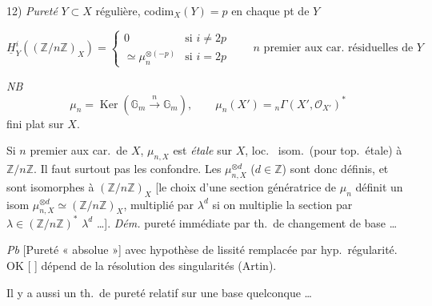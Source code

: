 \documentclass[11pt,a4paper]{article}
\begin{document}
12) \emph{Pureté} $Y \subset X$ régulière, codim${}_X(Y) = p$ en chaque pt
de $Y$


\[
  \underline{H}^i_Y((\mathbb{Z}/n\mathbb{Z})_X) =
  \begin{cases}
    0 & \text{si } i \neq 2p \\
    \simeq \mu_n^{\otimes(-p)} & \text{si } i = 2p
  \end{cases}
  \qquad n \text{ premier aux car.\ résiduelles de } Y
\]

\emph{NB}
\[
  \mu_n = \operatorname{Ker}(\mathbb{G}_m \xrightarrow{\;n\;} \mathbb{G}_m),
  \qquad
  \mu_n(X') = {}_n\Gamma(X', \mathcal{O}_{X'})^{*}
\]
 fini plat sur $X$.

Si $n$ premier aux car.\ de $X$, $\mu_{n,X}$ est \emph{étale} sur $X$, loc.\
isom.\ (pour top.\ étale) à $\mathbb{Z}/n\mathbb{Z}$. Il \add{ne} faut surtout
pas les confondre. Les $\mu_{n,X}^{\otimes d}$ ($d \in \mathbb{Z}$) sont donc
définis, et sont \add{loc.} isomorphes à $(\mathbb{Z}/n\mathbb{Z})_X$ [le
choix d'une section génératrice de $\mu_n$ définit un isom
$\mu_{n,X}^{\otimes d} \simeq (\mathbb{Z}/n\mathbb{Z})_X$, multiplié par
$\lambda^d$ si on multiplie la section par
$\lambda \in (\mathbb{Z}/n\mathbb{Z})^{*}$ \ill{} $\lambda^d$ …].
\emph{Dém.} pureté immédiate par th.\ de changement de base …

\emph{Pb} [Pureté « absolue »] avec hypothèse de lissité remplacée par hyp.\
régularité. OK  [ \ill{}
\ill{}] \ill{} dépend de la résolution des singularités (Artin).

Il y a aussi un th.\ de pureté relatif sur une base quelconque …

\end{document}

